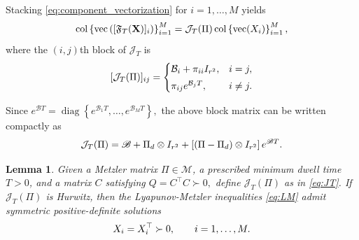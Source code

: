 \documentclass[conference]{IEEEtran}
\newtheorem{lemma}{Lemma}
\begin{document}
	Stacking \eqref{eq:component_vectorization} for
	$i=1,\ldots,M$ yields
	\vspace{-0.2\baselineskip}
	\begin{equation}
		\operatorname{col}
		\left\{
		\operatorname{vec}
		\left(
		[\mathfrak F_T(\mathbf X)]_i
		\right)
		\right\}_{i=1}^{M}
		=
		\mathcal J_T(\Pi)
		\operatorname{col}
		\left\{
		\operatorname{vec}(X_i)
		\right\}_{i=1}^{M},		
		\label{eq:stacked_operator}
		\vspace{-0.2\baselineskip}
	\end{equation}
	where the $(i,j)$th block of $\mathcal J_T$ is
	\vspace{-0.2\baselineskip}
	\[
	[\mathcal J_T(\Pi)]_{ij}
	=
	\begin{cases}
		\mathcal B_i+\pi_{ii}I_{r^2},
		& i=j,\\[1mm]
		\pi_{ij}e^{\mathcal B_jT},
		& i\ne j.
	\end{cases}
	\vspace{-0.2\baselineskip}
	\]
	
	Since
	$
	e^{\mathscr BT}
	=
	\operatorname{diag}
	\left\{
	e^{\mathcal B_1T},
	\ldots,
	e^{\mathcal B_MT}
	\right\},
	$
	the above block matrix can be written compactly as
	\vspace{-0.2\baselineskip}
	\begin{equation}
		\mathcal J_T(\Pi)
		=
		\mathscr B
		+
		\Pi_d\otimes I_{r^2}
		+
		\left[
		(\Pi-\Pi_d)\otimes I_{r^2}
		\right]
		e^{\mathscr BT}.		
		\label{eq:JT}
		\vspace{-0.2\baselineskip}
	\end{equation}
	
	\begin{lemma}\label{lem:lifted_sufficient}
		Given a Metzler matrix $\Pi\in\mathcal M$, a prescribed minimum 
		dwell time $T>0$, and a matrix $C$ satisfying
		$
		Q=C^\top C\succ0,
		$
		define $\mathcal J_T(\Pi)$ as in \eqref{eq:JT}. If $\mathcal J_T(\Pi)$
		is Hurwitz, then the Lyapunov-Metzler inequalities
		\eqref{eq:LM} admit symmetric positive-definite solutions
		\vspace{-0.2\baselineskip}
		\[
		X_i=X_i^\top\succ0,
		\qquad
		i=1,\ldots,M.		
		\vspace{-0.2\baselineskip}
		\]
	\end{lemma}
	
\end{document}
